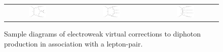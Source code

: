 \begin{figure}[t!]
  \begin{tabular}{ccccc}
    \includegraphics[width=0.288\textwidth]{diagrams/aaZ_V_2} & &
    \includegraphics[width=0.288\textwidth]{diagrams/aaZ_V_1} & &
    \includegraphics[width=0.288\textwidth]{diagrams/aaZ_V_3} \\
  \end{tabular}
  \caption{
    Sample diagrams of electroweak virtual corrections to diphoton 
    production in association with a lepton-pair.
  }
\end{figure}
